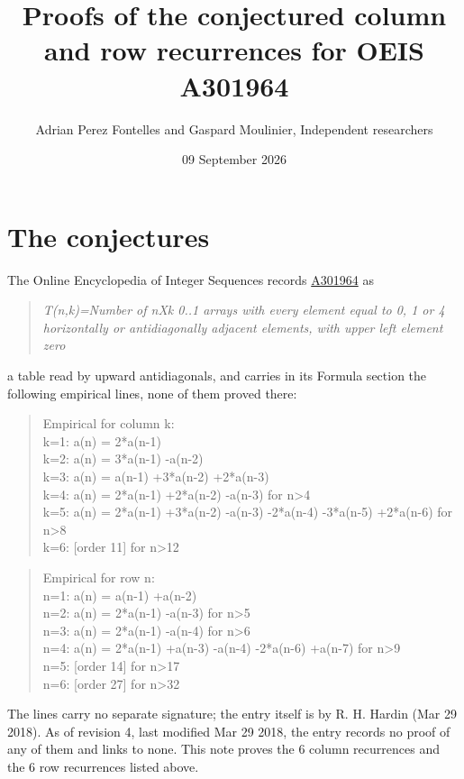 \documentclass[11pt]{article}
\title{Proofs of the conjectured column and row recurrences for OEIS A301964}
\author{Adrian Perez Fontelles and Gaspard Moulinier, Independent researchers}
\date{09 September 2026}
\theoremstyle{definition}
\begin{document}
\maketitle
\section{The conjectures}

The Online Encyclopedia of Integer Sequences records \href{https://oeis.org/A301964}{A301964} as

\begin{quote}\itshape T(n,k)=Number of nXk 0..1 arrays with every element equal to 0, 1 or 4 horizontally or antidiagonally adjacent elements, with upper left element zero\end{quote}

a table read by upward antidiagonals, and carries in its Formula section the following empirical lines, none of them proved there:

\begin{quote}\ttfamily Empirical for column k:\\
k=1: a(n) = 2*a(n-1)\\k=2: a(n) = 3*a(n-1) -a(n-2)\\k=3: a(n) = a(n-1) +3*a(n-2) +2*a(n-3)\\k=4: a(n) = 2*a(n-1) +2*a(n-2) -a(n-3) for n>4\\k=5: a(n) = 2*a(n-1) +3*a(n-2) -a(n-3) -2*a(n-4) -3*a(n-5) +2*a(n-6) for n>8\\k=6: [order 11] for n>12\end{quote}

\begin{quote}\ttfamily Empirical for row n:\\
n=1: a(n) = a(n-1) +a(n-2)\\n=2: a(n) = 2*a(n-1) -a(n-3) for n>5\\n=3: a(n) = 2*a(n-1) -a(n-4) for n>6\\n=4: a(n) = 2*a(n-1) +a(n-3) -a(n-4) -2*a(n-6) +a(n-7) for n>9\\n=5: [order 14] for n>17\\n=6: [order 27] for n>32\end{quote}

The lines carry no separate signature; the entry itself is by R. H. Hardin (Mar 29 2018). As of revision 4, last modified Mar 29 2018, the entry records no proof of any of them and links to none. This note proves the 6 column recurrences and the 6 row recurrences listed above.
\end{document}
